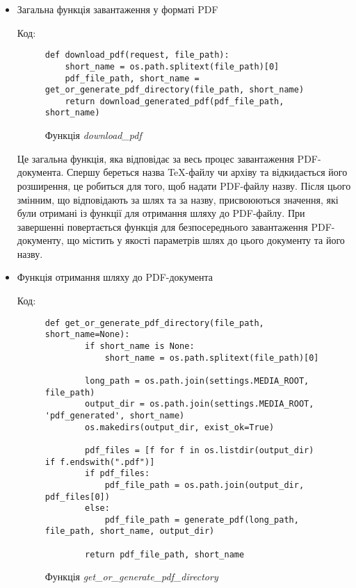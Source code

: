 \documentclass[a4paper,14pt]{extarticle}
\numberwithin{figure}{section}
\begin{document}
    \begin{itemize}
    \item Загальна функція завантаження у форматі PDF

    Код:
    \begin{figure}[h]
    \centering
    \begin{lstlisting}[style=mystyle]
    def download_pdf(request, file_path):
    short_name = os.path.splitext(file_path)[0]
    pdf_file_path, short_name = get_or_generate_pdf_directory(file_path, short_name)
    return download_generated_pdf(pdf_file_path, short_name)
    \end{lstlisting}
    \caption{\normalsize Функція \textit{download\_pdf}}
    \end{figure}

    Це загальна функція, яка відповідає за весь процес завантаження PDF-документа. 
    Спершу береться назва TeX-файлу чи архіву та відкидається його розширення, це робиться для того, щоб надати PDF-файлу назву. Після цього змінним, що відповідають за шлях та за назву, присвоюються значення, які були отримані із функції для отримання шляху до PDF-файлу. При завершенні повертається функція для безпосереднього завантаження PDF-документу, що містить у якості параметрів шлях до цього документу та його назву.
    
    \newpage
    \item Функція отримання шляху до PDF-документа

    Код:
    \begin{figure}[h]
    \centering
    \begin{lstlisting}[style=mystyle]
    def get_or_generate_pdf_directory(file_path, short_name=None):
        if short_name is None:
            short_name = os.path.splitext(file_path)[0]
    
        long_path = os.path.join(settings.MEDIA_ROOT, file_path)
        output_dir = os.path.join(settings.MEDIA_ROOT, 'pdf_generated', short_name)
        os.makedirs(output_dir, exist_ok=True)
    
        pdf_files = [f for f in os.listdir(output_dir) if f.endswith(".pdf")]
        if pdf_files:
            pdf_file_path = os.path.join(output_dir, pdf_files[0])
        else:
            pdf_file_path = generate_pdf(long_path, file_path, short_name, output_dir)
    
        return pdf_file_path, short_name
    \end{lstlisting}
    \caption{\normalsize Функція \textit{get\_or\_generate\_pdf\_directory}}
    \end{figure}


\end{itemize}
\end{document}
